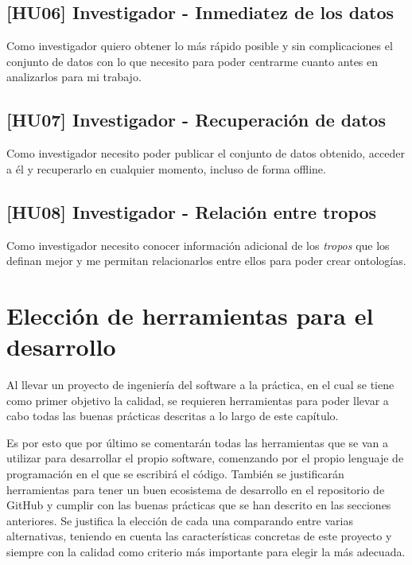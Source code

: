 \subsection{[HU06] Investigador - Inmediatez de los datos}
Como investigador quiero obtener lo más rápido posible y sin complicaciones el
conjunto de datos con lo que necesito para poder centrarme cuanto antes en
analizarlos para mi trabajo.

\subsection{[HU07] Investigador - Recuperación de datos}
Como investigador necesito poder publicar el conjunto de datos obtenido, acceder
a él y recuperarlo en cualquier momento, incluso de forma offline.

\subsection{[HU08] Investigador - Relación entre tropos}
Como investigador necesito conocer información adicional de los \textit{tropos}
que los definan mejor y me permitan relacionarlos entre ellos para poder crear
ontologías.



\section{Elección de herramientas para el desarrollo}
Al llevar un proyecto de ingeniería del software a la práctica, en el cual se
tiene como primer objetivo la calidad, se requieren herramientas para poder
llevar a cabo todas las buenas prácticas descritas a lo largo de este capítulo. 

Es por esto que por último se comentarán todas las herramientas que se van a
utilizar para desarrollar el propio software, comenzando por el propio lenguaje
de programación en el que se escribirá el código. También se justificarán
herramientas para tener un buen ecosistema de desarrollo en el repositorio de
GitHub y cumplir con las buenas prácticas que se han descrito en las secciones
anteriores. Se justifica la elección de cada una comparando entre varias
alternativas, teniendo en cuenta las características concretas de este proyecto
y siempre con la calidad como criterio más importante para elegir la más
adecuada.

